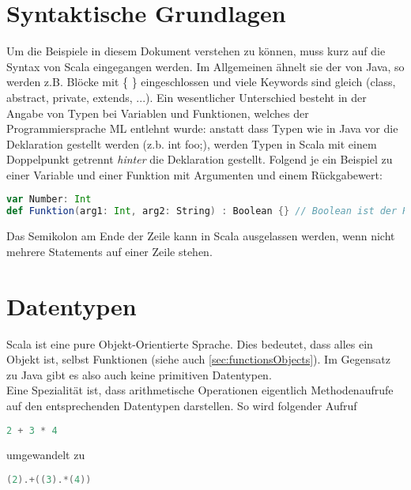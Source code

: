 \section{Syntaktische Grundlagen}
\label{sec:syntax}

Um die Beispiele in diesem Dokument verstehen zu können, muss kurz
auf die Syntax von Scala eingegangen werden. Im Allgemeinen ähnelt
sie der von Java, so werden z.B. Blöcke mit \{ \} eingeschlossen und
viele Keywords sind gleich (class, abstract, private, extends, ...).
Ein wesentlicher Unterschied besteht in der Angabe von Typen bei
Variablen und Funktionen, welches der Programmiersprache ML entlehnt
wurde: anstatt dass Typen wie in Java vor die Deklaration gestellt werden
(z.b. int foo;), werden Typen in Scala mit einem Doppelpunkt getrennt
\emph{hinter} die Deklaration gestellt. Folgend je ein Beispiel zu einer
Variable und einer Funktion mit Argumenten und einem Rückgabewert:

\begin{lstlisting}[float=ht,language=scala,caption=Typenangabe,label=lst:types]
var Number: Int
def Funktion(arg1: Int, arg2: String) : Boolean {} // Boolean ist der Rueckgabewert
\end{lstlisting}

Das Semikolon am Ende der Zeile kann in Scala ausgelassen werden, wenn nicht
mehrere Statements auf einer Zeile stehen.

\section{Datentypen}
\label{sec:datatypes}

Scala ist eine pure Objekt-Orientierte Sprache. Dies bedeutet, dass alles
ein Objekt ist, selbst Funktionen (siehe auch \ref{sec:functionsObjects}). Im
Gegensatz zu Java gibt es also auch keine primitiven Datentypen.\\

Eine Spezialität ist, dass arithmetische Operationen eigentlich
Methodenaufrufe auf den entsprechenden Datentypen darstellen. So wird
folgender Aufruf

\begin{lstlisting}[float=ht,language=scala,caption=Arithmetische Operationen,label=lst:arithmetic]
2 + 3 * 4
\end{lstlisting}

umgewandelt zu
\begin{lstlisting}[float=ht,language=scala,caption=Arithmetische Operationen konvertiert,label=lst:arithmeticConverted]
(2).+((3).*(4))
\end{lstlisting}


